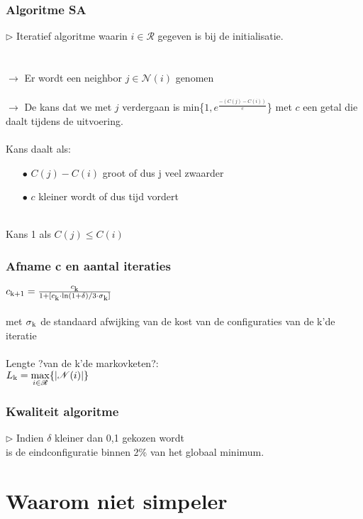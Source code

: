 \documentclass
   [kulak] %
   {kulakbeamer}
\begin{document}
\begin{frame}
	\frametitle{Algoritme SA}
	$\triangleright$ Iteratief algoritme waarin $i \in \mathscr{R}$ gegeven is bij de initialisatie. \\~\\~\\ \pause
	$\rightarrow$ Er wordt een neighbor $j \in \mathscr{N}(i)$ genomen \\~\\ \pause
	$\rightarrow$ De kans dat we met $j$ verdergaan is min\{$1,e^{\frac{-(C(j)-C(i))}{c}}$\} met $c$ een getal die daalt tijdens de uitvoering.\\~\\
	\pause
	Kans daalt als:
	\begin{itemize}
		\item[$\bullet$] $C(j)-C(i)$ groot of dus j veel zwaarder
		
		\item[$\bullet$] $c$ kleiner wordt of dus tijd vordert
		
		
	\end{itemize}
	\pause
	~\\Kans 1 als $C(j) \leqslant C(i)$
	
	
\end{frame}

\begin{frame}
	\frametitle{Afname c en aantal iteraties}
	$c\textsubscript{k+1} = \frac{c\textsubscript{k}}{1 + [c\textsubscript{k}\cdot \ln(1 + \delta)/3\cdot \sigma\textsubscript{k}]}$ \\~\\ met $\sigma\textsubscript{k}$ de standaard afwijking van de kost van de configuraties van de k'de iteratie
	\\~\\\pause
	Lengte ?van de k'de markovketen?:\\
	$L\textsubscript{k} = \displaystyle \max_{i \in \mathscr{R}}\{|\mathscr{N}(i)|\}$
\end{frame}

\begin{frame}
	\frametitle{Kwaliteit algoritme}
	
	$\triangleright$ Indien $\delta$ kleiner dan 0,1 gekozen wordt\\
	is de eindconfiguratie binnen 2\% van het globaal minimum.
	
\end{frame}

\section[simpeler?]{Waarom niet simpeler}
\end{document}
